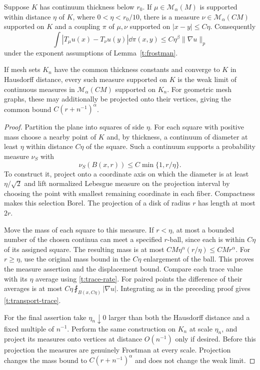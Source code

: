 \begin{lemma}\label{t:transport}
Suppose $K$ has continuum thickness below $r_0$.  If
$\mu\in\mathcal M_\alpha(M)$ is supported within distance $\eta$ of $K$,
where $0<\eta<r_0/10$, there is a measure
$\nu\in\mathcal M_\alpha(CM)$ supported on $K$ and a coupling $\pi$ of
$\mu,\nu$ supported on $|x-y|\le C\eta$.  Consequently
\begin{equation}\label{t:transport-trace}
 \int|T_\mu u(x)-T_\nu u(y)|\dd\pi(x,y)
 \le C\eta^\beta\|\nabla u\|_p
\end{equation}
under the exponent assumptions of Lemma~\ref{t:frostman}.

If mesh sets $K_n$ have the common thickness constants and converge to $K$
in Hausdorff distance, every such measure supported on $K$ is the weak
limit of continuous measures in $\mathcal M_\alpha(CM)$ supported on
$K_n$.  For geometric mesh graphs, these may additionally be projected
onto their vertices, giving the common bound $C(r+n^{-1})^\alpha$.
\end{lemma}
\begin{proof}
Partition the plane into squares of side $\eta$.  For each square with
positive mass choose a nearby point of $K$ and, by thickness, a continuum
of diameter at least $\eta$ within distance $C\eta$ of the square.
Such a continuum supports a probability measure $\nu_S$ with
\[
 \nu_S(B(x,r))\le C\min\{1,r/\eta\}.
\]
To construct it, project onto a coordinate axis on which the diameter is
at least $\eta/\sqrt2$ and lift normalized Lebesgue measure on the
projection interval by choosing the point with smallest remaining
coordinate in each fiber.  Compactness makes this selection Borel.
The projection of a disk of radius $r$ has length at most $2r$.

Move the mass of each square to this measure.  If $r<\eta$, at most a
bounded number of the chosen continua can meet a specified $r$-ball,
since each is within $C\eta$ of its assigned square.  The resulting mass
is at most $CM\eta^\alpha(r/\eta)\le CM r^\alpha$.
For $r\ge\eta$, use the original mass bound in the $C\eta$ enlargement
of the ball.  This proves the measure assertion and the displacement
bound.  Compare each trace value with its $\eta$ average using
\eqref{t:trace-rate}.  For paired points the difference of their averages
is at most $C\eta\fint_{B(x,C\eta)}|\nabla u|$.  Integrating as in the
preceding proof gives \eqref{t:transport-trace}.

For the final assertion take $\eta_n\downarrow0$ larger than both the
Hausdorff distance and a fixed multiple of $n^{-1}$.  Perform the same
construction on $K_n$ at scale $\eta_n$, and project its measures onto
vertices at distance $O(n^{-1})$ only if desired.  Before this projection
the measures are genuinely Frostman at every scale.  Projection changes
the mass bound to
$C(r+n^{-1})^\alpha$ and does not change the weak limit.
\end{proof}

